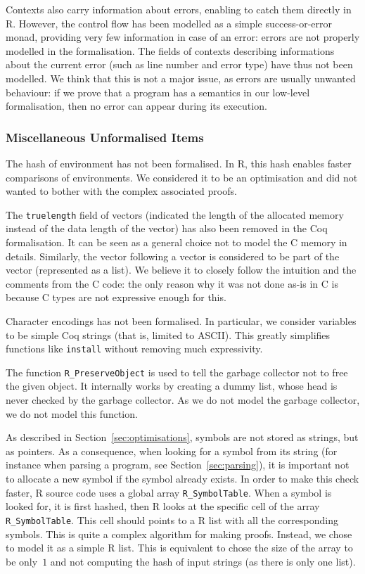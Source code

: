 \documentclass{article}
\newcommand\Coq{Coq}
\newcommand\R{R}
\newcommand\Cn{C}
\begin{document}
Contexts also carry information about errors,
enabling to catch them directly in \R{}.
However,  the control flow has been modelled as a simple
success-or-error monad,
providing very few information in case of an error:
errors are not properly modelled in the formalisation.
The fields of contexts describing informations about
the current error
(such as line number and error type)
have thus not been modelled.
We think that this is not a major issue,
as errors are usually unwanted behaviour:
if we prove that a program has a semantics
in our low-level formalisation,
then no error can appear during its execution.


\subsubsection{Miscellaneous Unformalised Items}
\label{sec:coverage:unformalised}

The hash of environment has not been formalised.
In \R{}, this hash enables faster comparisons of environments.
We considered it to be an optimisation and did not wanted to bother
with the complex associated proofs.

The \texttt{truelength} field of vectors
(indicated the length of the allocated memory
instead of the data length of the vector)
has also been removed in the \Coq{} formalisation.
It can be seen as a general choice not to model the \Cn{} memory in details.
Similarly, the vector following a vector is considered to be part
of the vector (represented as a list).
We believe it to closely follow the intuition and the comments from the \Cn{} code:
the only reason why it was not done as-is in \Cn{} is because \Cn{} types
are not expressive enough for this.

Character encodings has not been formalised.
In particular, we consider variables to be simple
\Coq{} strings (that is, limited to ASCII).
This greatly simplifies functions like \texttt{install}
without removing much expressivity.

The function \texttt{R_PreserveObject} is used to tell the garbage collector
not to free the given object.
It internally works by creating a dummy list,
whose head is never checked by the garbage collector.
As we do not model the garbage collector,
we do not model this function.

As described in Section~\ref{sec:optimisations},
symbols are not stored as strings,
but as pointers.
As a consequence, when looking for a symbol from its string
(for instance when parsing a program, see Section~\ref{sec:parsing}),
it is important not to allocate a new symbol if the
symbol already exists.
In order to make this check faster,
\R{} source code uses a global array \texttt{R_SymbolTable}.
When a symbol is looked for, it is first hashed,
then \R{} looks at the specific cell
of the array \texttt{R_SymbolTable}.
This cell should points to a \R{} list with all the corresponding symbols.
This is quite a complex algorithm for making proofs.
Instead, we chose to model it as a simple \R{} list.
This is equivalent to chose the size of the array to be only~\(1\)
and not computing the hash of input strings
(as there is only one list).
\end{document}
